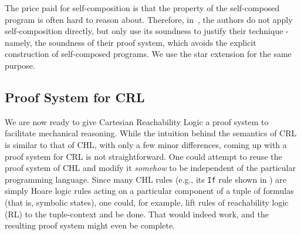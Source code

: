 The price paid for self-composition is that the property of the self-composed program is often hard to reason about.
Therefore, in~\cite{SousaD16}, the authors do not apply self-composition directly, but only use its soundness to justify
their technique - namely, the soundness of their proof system, which avoids the explicit construction
of self-composed programs.
We use the star extension for the same purpose.



\subsection{Proof System for CRL}
\label{sec:proof-system}



We are now ready to give Cartesian Reachability Logic a proof system to
facilitate mechanical reasoning.  While the intuition behind the semantics of
CRL is similar to that of CHL, with only a few minor differences, coming up
with a proof system for CRL is not straightforward.  One could attempt to reuse the proof
system of CHL and modify it \emph{somehow} to be independent of the particular
programming language.  Since many CHL rules (e.g., its \texttt{If} rule shown
in ) are simply Hoare logic rules acting on a particular
component of a tuple of formulas (that is, symbolic states), one could, for
example, lift rules of reachability logic (RL) to the tuple-context and be
done.  That would indeed work, and the resulting proof system might even be
complete.

